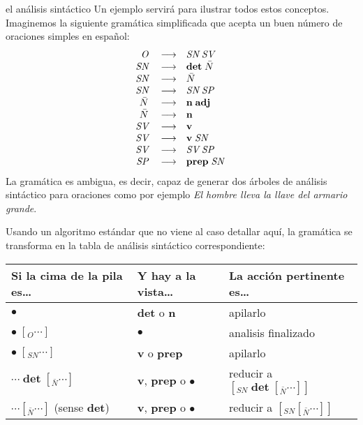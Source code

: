 \begin{persabermes}{el análisis sintáctico}
Un ejemplo servirá para ilustrar todos estos conceptos. Imaginemos la siguiente gramática simplificada que acepta un buen número de oraciones simples en español\label{pg:gramsenz}: $$ \begin{array}{rcl} \mbox{\em O}\; &\longrightarrow & \mbox{\em SN}\; \mbox{\em SV}\; \\ \mbox{\em SN}\; &\longrightarrow & \mbox{\bf det}\; \mbox{\em $\bar{N}$}\; \\ \mbox{\em SN}\; &\longrightarrow & \mbox{\em $\bar{N}$}\; \\ \mbox{\em SN}\; &\longrightarrow & \mbox{\em SN}\; \mbox{\em SP}\; \\ \mbox{\em $\bar{N}$}\; &\longrightarrow & \mbox{\bf n}\; \mbox{\bf adj}\; \\ \mbox{\em $\bar{N}$}\; &\longrightarrow & \mbox{\bf n}\; \\ \mbox{\em SV}\; &\longrightarrow & \mbox{\bf v}\; \\ \mbox{\em SV}\; &\longrightarrow & \mbox{\bf v}\; \mbox{\em SN}\; \\ \mbox{\em SV}\; &\longrightarrow & \mbox{\em SV}\; \mbox{\em SP}\; \\ \mbox{\em SP}\; &\longrightarrow & \mbox{\bf prep}\; \mbox{\em SN}\; \\ \end{array} $$ La gramática es ambigua, es decir, capaz de generar dos árboles de análisis sintáctico para oraciones como por ejemplo \emph{El hombre lleva la llave del armario grande}. 

Usando un algoritmo estándar que no viene al caso detallar aquí, la gramática se transforma en la tabla de análisis sintáctico correspondiente: 

\begin{center} \begin{tabular}{l|l|l} \hline

\textsf{Si la cima de la pila es\ldots} &\textsf{Y hay a la vista\ldots} &\textsf{La acción pertinente es\ldots} \\ \hline

$\bullet$ &\textbf{det} o \textbf{n} &apilarlo \\ \hline

$\bullet\; [_O \cdots ]$ &$\bullet$ &analisis finalizado \\ \hline $\bullet\; [_{SN} \cdots ]$ &\textbf{v} o \textbf{prep} &apilarlo \\ 

\hline

$\cdots\; \textbf{det} \; [_{\bar{N}} \cdots ]$ &\textbf{v}, \textbf{prep} o $\bullet$ &reducir a $[_{SN}\; \textbf{det}\;[_{\bar{N}} \cdots ] ]$ \\ \hline

$\cdots [_{\bar{N}} \cdots ]$ (sense \textbf{det}) &\textbf{v}, \textbf{prep} o $\bullet$ &reducir a $[_{SN} [_{\bar{N}} \cdots ] ]$ \\ 


\end{tabular}
\end{center}
\end{persabermes}
